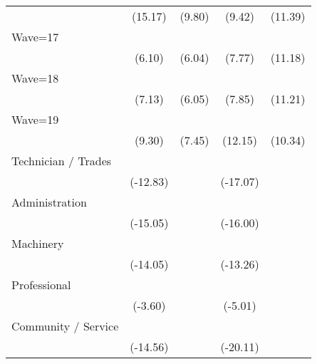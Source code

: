 {\begin{tabular}{l*{4}{c}}
                    &     (15.17)         &      (9.80)         &      (9.42)         &     (11.39)         \\
[1em]
Wave=17             &            \sym{***}&            \sym{***}&            \sym{***}&            \sym{***}\\
                    &      (6.10)         &      (6.04)         &      (7.77)         &     (11.18)         \\
[1em]
Wave=18             &            \sym{***}&            \sym{***}&            \sym{***}&            \sym{***}\\
                    &      (7.13)         &      (6.05)         &      (7.85)         &     (11.21)         \\
[1em]
Wave=19             &            \sym{***}&            \sym{***}&            \sym{***}&            \sym{***}\\
                    &      (9.30)         &      (7.45)         &     (12.15)         &     (10.34)         \\
[1em]
Technician / Trades &            \sym{***}&                     &            \sym{***}&                     \\
                    &    (-12.83)         &                     &    (-17.07)         &                     \\
[1em]
Administration      &            \sym{***}&                     &            \sym{***}&                     \\
                    &    (-15.05)         &                     &    (-16.00)         &                     \\
[1em]
Machinery           &            \sym{***}&                     &            \sym{***}&                     \\
                    &    (-14.05)         &                     &    (-13.26)         &                     \\
[1em]
Professional        &            \sym{***}&                     &            \sym{***}&                     \\
                    &     (-3.60)         &                     &     (-5.01)         &                     \\
[1em]
Community / Service &            \sym{***}&                     &            \sym{***}&                     \\
                    &    (-14.56)         &                     &    (-20.11)         &                     \\

\end{tabular}}
